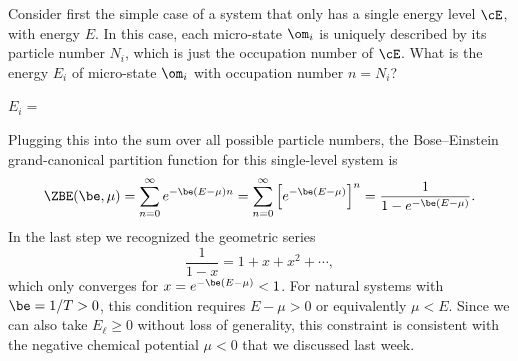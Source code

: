 Consider first the simple case of a system that only has a single energy level $\cE$, with energy $E$.
In this case, each micro-state $\om_i$ is uniquely described by its particle number $N_i$, which is just the occupation number of $\cE$.
What is the energy $E_i$ of micro-state $\om_i$ with occupation number $n = N_i$?
\begin{mdframed}
  $E_i = $ \\[24 pt]
\end{mdframed}

Plugging this into the sum over all possible particle numbers, the Bose--Einstein grand-canonical partition function for this single-level system is
\begin{equation}
  \label{eq:BEsingle}
  \ZBE(\be, \mu) = \sum_{n = 0}^{\infty} e^{-\be (E - \mu) n} = \sum_{n = 0}^{\infty} \left[e^{-\be (E - \mu)}\right]^n = \frac{1}{1 - e^{-\be (E - \mu)}}.
\end{equation}
In the last step we recognized the geometric series
\begin{equation*}
  \frac{1}{1 - x} = 1 + x + x^2 + \cdots,
\end{equation*}
which only converges for $x = e^{-\be (E - \mu)} < 1$.
For natural systems with $\be = 1 / T > 0$, this condition requires $E - \mu > 0$ or equivalently $\mu < E$.
Since we can also take $E_{\ell} \geq 0$ without loss of generality, this constraint is consistent with the negative chemical potential $\mu < 0$ that we discussed last week.


